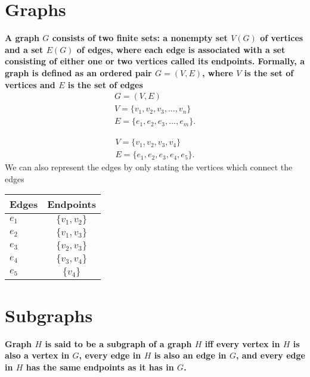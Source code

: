 \documentclass{report}
\begin{document}
    \section{\LARGE Graphs}
    \smallbreak \noindent
    \begin{definition}
    \textbf{ A \textbf{graph} $G$ consists of two finite sets: a nonempty set $V(G)$ of vertices and a set $E(G)$ of edges, where each edge is associated with a set consisting of either one or two vertices called its endpoints. Formally, a \textbf{graph} is defined as an ordered pair $G = (V,E)$, where $V$ is the set of vertices and $E$ is the set of edges
        \begin{align*}
            G = (V,E) \\
            V = \{v_{1},v_{2},v_{3},...,v_{n}\} \\
            E = \{e_{1}, e_{2}, e_{3}, ..., e_{m}\}
        .\end{align*}
} 
    \end{definition}
    \bigbreak \noindent 
    \begin{minipage}{0.47\textwidth}
    \end{minipage}
    \begin{minipage}{0.47\textwidth}
    \begin{align*}
        V = \{v_{1},v_{2}, v_{3}, v_{4}\} \\
        E = \{e_{1}, e_{2},e_{3},e_{4},e_{5}\}
    .\end{align*}
    We can also represent the edges by only stating the vertices which connect the edges
        \begin{center}
        \begin{tabular}{|l|c|}
        \hline
        Edges & Endpoints \\
        	\hline
        $e_{1}$& $\{v_{1},v_{2}\} $   \\
        	\hline
        $e_{2}$ & $\{v_{1}, v_{3}\} $ \\
        \hline
        $e_{3}$ & $\{v_{2}, v_{3}\} $ \\
        \hline 
        $e_{4}$ & $\{v_{3}, v_{4}\} $ \\
        \hline
        $e_{5}$ & $\{v_{4}\} $ \\
        \hline
        \end{tabular}
    \end{center}
    \end{minipage}

    \pagebreak \bigbreak \noindent 
    \section{\LARGE Subgraphs}
    \smallbreak \noindent
    \begin{definition}
    \textbf{ Graph $H$ is said to be a \textbf{subgraph} of a graph $H$ iff every vertex in $H$ is also a vertex in $G$, every edge in $H$ is also an edge in $G$, and every edge in $H$ has the same endpoints as it has in $G$.} 
    \end{definition}
    
\end{document}
